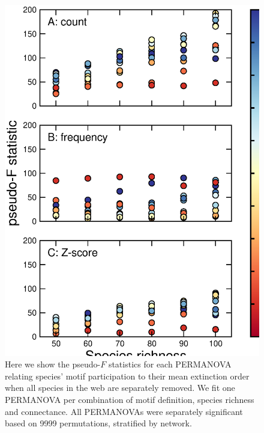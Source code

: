 \documentclass[12pt]{article}
\begin{document}
		\begin{figure}[hb!]
		    \centering
			\caption{Here we show the pseudo-$F$ statistics for each PERMANOVA relating species' motif participation to their mean extinction order when all species in the web are separately removed. We fit one PERMANOVA per combination of motif definition, species richness and connectance. All PERMANOVAs were separately significant based on 9999 permutations, stratified by network. }
			\label{permfig}
			\includegraphics[height=.65\textheight]{figures/extinction_order/permanova_summary.eps}
			\end{figure}
\end{document}
